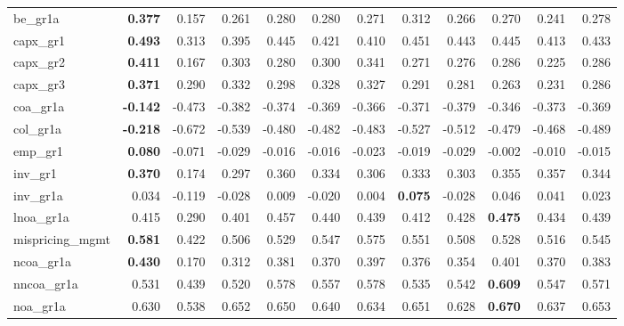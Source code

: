 \begin{landscape}
\begin{longtable}{>{\raggedright\arraybackslash}p{2.6cm}rrrrrrrrrrr}
be\_gr1a & \textbf{0.377} & 0.157 & 0.261 & 0.280 & 0.280 & 0.271 & 0.312 & 0.266 & 0.270 & 0.241 & 0.278 \\
capx\_gr1 & \textbf{0.493} & 0.313 & 0.395 & 0.445 & 0.421 & 0.410 & 0.451 & 0.443 & 0.445 & 0.413 & 0.433 \\
capx\_gr2 & \textbf{0.411} & 0.167 & 0.303 & 0.280 & 0.300 & 0.341 & 0.271 & 0.276 & 0.286 & 0.225 & 0.286 \\
capx\_gr3 & \textbf{0.371} & 0.290 & 0.332 & 0.298 & 0.328 & 0.327 & 0.291 & 0.281 & 0.263 & 0.231 & 0.286 \\
coa\_gr1a & \textbf{-0.142} & -0.473 & -0.382 & -0.374 & -0.369 & -0.366 & -0.371 & -0.379 & -0.346 & -0.373 & -0.369 \\
col\_gr1a & \textbf{-0.218} & -0.672 & -0.539 & -0.480 & -0.482 & -0.483 & -0.527 & -0.512 & -0.479 & -0.468 & -0.489 \\
emp\_gr1 & \textbf{0.080} & -0.071 & -0.029 & -0.016 & -0.016 & -0.023 & -0.019 & -0.029 & -0.002 & -0.010 & -0.015 \\
inv\_gr1 & \textbf{0.370} & 0.174 & 0.297 & 0.360 & 0.334 & 0.306 & 0.333 & 0.303 & 0.355 & 0.357 & 0.344 \\
inv\_gr1a & 0.034 & -0.119 & -0.028 & 0.009 & -0.020 & 0.004 & \textbf{\cellcolor{blue!10}0.075} & -0.028 & \cellcolor{blue!10}0.046 & \cellcolor{blue!10}0.041 & 0.023 \\
lnoa\_gr1a & 0.415 & 0.290 & 0.401 & \cellcolor{blue!10}0.457 & \cellcolor{blue!10}0.440 & \cellcolor{blue!10}0.439 & 0.412 & \cellcolor{blue!10}0.428 & \textbf{\cellcolor{blue!10}0.475} & \cellcolor{blue!10}0.434 & \cellcolor{blue!10}0.439 \\
mispricing\_mgmt & \textbf{0.581} & 0.422 & 0.506 & 0.529 & 0.547 & 0.575 & 0.551 & 0.508 & 0.528 & 0.516 & 0.545 \\
ncoa\_gr1a & \textbf{0.430} & 0.170 & 0.312 & 0.381 & 0.370 & 0.397 & 0.376 & 0.354 & 0.401 & 0.370 & 0.383 \\
nncoa\_gr1a & 0.531 & 0.439 & 0.520 & \cellcolor{blue!10}0.578 & \cellcolor{blue!10}0.557 & \cellcolor{blue!10}0.578 & \cellcolor{blue!10}0.535 & \cellcolor{blue!10}0.542 & \textbf{\cellcolor{blue!10}0.609} & \cellcolor{blue!10}0.547 & \cellcolor{blue!10}0.571 \\
noa\_gr1a & 0.630 & 0.538 & \cellcolor{blue!10}0.652 & \cellcolor{blue!10}0.650 & \cellcolor{blue!10}0.640 & \cellcolor{blue!10}0.634 & \cellcolor{blue!10}0.651 & 0.628 & \textbf{\cellcolor{blue!10}0.670} & \cellcolor{blue!10}0.637 & \cellcolor{blue!10}0.653 \\

\end{longtable}
\end{landscape}
